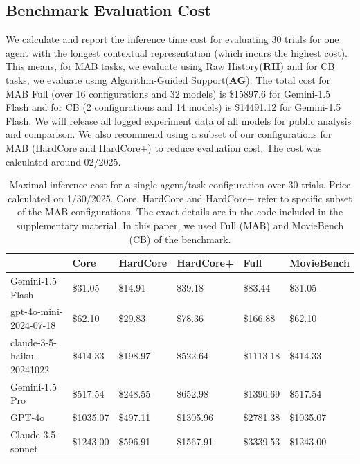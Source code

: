 \documentclass[11pt, logo]{googledeepmind}
\newcommand{\RH}{\textbf{RH}\xspace}
\newcommand{\AG}{\textbf{AG}\xspace}
\newcommand{\ag}{Algorithm-Guided Support\xspace}
\newcommand{\rah}{Raw History\xspace}
\theoremstyle{plain}
\theoremstyle{definition}
\begin{document}
\subsection{Benchmark Evaluation Cost}
We calculate and report the inference time cost for evaluating 30 trials for one agent with the longest contextual representation (which incurs the highest cost). This means, for MAB tasks, we evaluate using \rah (\RH) and for CB tasks, we evaluate using \ag (\AG). The total cost for MAB Full (over 16 configurations and 32 models) is \$15897.6 for Gemini-1.5 Flash and for CB (2 configurations and 14 models) is \$14491.12 for Gemini-1.5 Flash. We will release all logged experiment data of all models for public analysis and comparison. We also recommend using a subset of our configurations for MAB (HardCore and HardCore+) to reduce evaluation cost. The cost was calculated around 02/2025.
\begin{table}[]
\centering
\small
\begin{tabular}{@{}llllll@{}}
\toprule
                      & Core         & HardCore     & HardCore+    & Full          & MovieBench   \\ \midrule
Gemini-1.5 Flash       & \$31.05  & \$14.91  & \$39.18  & \$83.44   & \$31.05  \\
gpt-4o-mini-2024-07-18     & \$62.10      & \$29.83      & \$78.36      & \$166.88      & \$62.10      \\
claude-3-5-haiku-20241022  & \$414.33     & \$198.97     & \$522.64     & \$1113.18     & \$414.33     \\
Gemini-1.5 Pro         & \$517.54 & \$248.55 & \$652.98 & \$1390.69 & \$517.54 \\ \midrule
GPT-4o          & \$1035.07    & \$497.11     & \$1305.96    & \$2781.38     & \$1035.07    \\
Claude-3.5-sonnet & \$1243.00    & \$596.91     & \$1567.91    & \$3339.53     & \$1243.00    \\
 \bottomrule
\end{tabular}
\caption{Maximal inference cost for a single agent/task configuration over 30 trials. Price calculated on 1/30/2025. Core, HardCore and HardCore+ refer to specific subset of the MAB configurations. The exact details are in the code included in the supplementary material. In this paper, we used Full (MAB) and MovieBench (CB) of the benchmark.}
\end{table}
\end{document}
